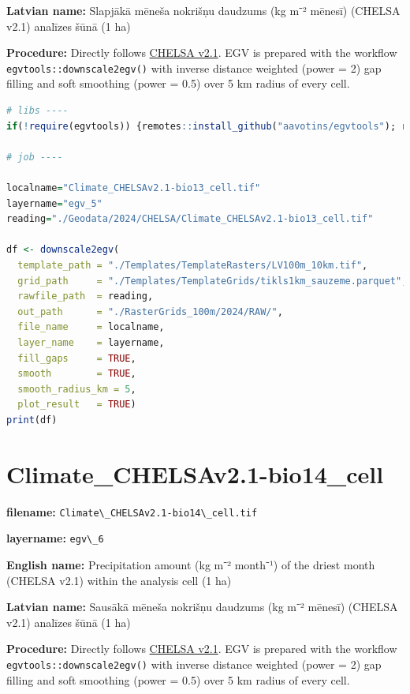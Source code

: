 \documentclass[
]{book}
\newcommand{\passthrough}[1]{#1}
\begin{document}
\textbf{Latvian name:} Slapjākā mēneša nokrišņu daudzums (kg m⁻² mēnesī) (CHELSA v2.1) analīzes šūnā (1 ha)

\textbf{Procedure:} Directly follows \hyperref[Ch04.11]{CHELSA v2.1}. EGV is prepared with the
workflow \passthrough{\lstinline!egvtools::downscale2egv()!} with inverse distance weighted (power = 2)
gap filling and soft smoothing (power = 0.5) over 5 km radius of every cell.

\begin{lstlisting}[language=R]
# libs ----
if(!require(egvtools)) {remotes::install_github("aavotins/egvtools"); require(egvtools)}

# job ----

localname="Climate_CHELSAv2.1-bio13_cell.tif"
layername="egv_5"
reading="./Geodata/2024/CHELSA/Climate_CHELSAv2.1-bio13_cell.tif"

df <- downscale2egv(
  template_path = "./Templates/TemplateRasters/LV100m_10km.tif",
  grid_path     = "./Templates/TemplateGrids/tikls1km_sauzeme.parquet",
  rawfile_path  = reading,
  out_path      = "./RasterGrids_100m/2024/RAW/",
  file_name     = localname,
  layer_name    = layername,
  fill_gaps     = TRUE,
  smooth        = TRUE,
  smooth_radius_km = 5,
  plot_result   = TRUE)
print(df)
\end{lstlisting}

\section{Climate\_CHELSAv2.1-bio14\_cell}\label{ch06.006}

\textbf{filename:} \passthrough{\lstinline!Climate\_CHELSAv2.1-bio14\_cell.tif!}

\textbf{layername:} \passthrough{\lstinline!egv\_6!}

\textbf{English name:} Precipitation amount (kg m⁻² month⁻¹) of the driest month (CHELSA v2.1) within the analysis cell (1 ha)

\textbf{Latvian name:} Sausākā mēneša nokrišņu daudzums (kg m⁻² mēnesī) (CHELSA v2.1) analīzes šūnā (1 ha)

\textbf{Procedure:} Directly follows \hyperref[Ch04.11]{CHELSA v2.1}. EGV is prepared with the
workflow \passthrough{\lstinline!egvtools::downscale2egv()!} with inverse distance weighted (power = 2)
gap filling and soft smoothing (power = 0.5) over 5 km radius of every cell.
\end{document}

